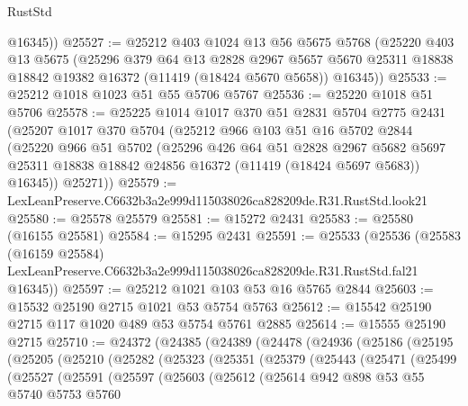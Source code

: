 \begin{lexlean}{RustStd}
\begin{coremodule}
        @16345))
@25527 := @25212
    @403
    @1024
    @13
    @56
    @5675
    @5768
    (@25220
      @403
      @13
      @5675
      (@25296
        @379
        @64
        @13
        @2828
        @2967
        @5657
        @5670
        @25311
        @18838
        @18842
        @19382
        @16372
        (@11419 (@18424 @5670 @5658))
        @16345))
@25533 := @25212 @1018 @1023 @51 @55 @5706 @5767
@25536 := @25220 @1018 @51 @5706
@25578 := @25225
    @1014
    @1017
    @370
    @51
    @2831
    @5704
    @2775
    @2431
    (@25207
      @1017
      @370
      @5704
      (@25212
        @966
        @103
        @51
        @16
        @5702
        @2844
        (@25220
          @966
          @51
          @5702
          (@25296
            @426
            @64
            @51
            @2828
            @2967
            @5682
            @5697
            @25311
            @18838
            @18842
            @24856
            @16372
            (@11419 (@18424 @5697 @5683))
            @16345))
        @25271))
@25579 := LexLeanPreserve.C6632b3a2e999d115038026ca828209de.R31.RustStd.look21
@25580 := @25578 @25579
@25581 := @15272 @2431
@25583 := @25580 (@16155 @25581)
@25584 := @15295 @2431
@25591 := @25533
    (@25536
      (@25583
        (@16159 @25584)
        LexLeanPreserve.C6632b3a2e999d115038026ca828209de.R31.RustStd.fal21
        @16345))
@25597 := @25212 @1021 @103 @53 @16 @5765 @2844
@25603 := @15532 @25190 @2715 @1021 @53 @5754 @5763
@25612 := @15542 @25190 @2715 @117 @1020 @489 @53 @5754 @5761 @2885
@25614 := @15555 @25190 @2715
@25710 := @24372
    (@24385
      (@24389
        (@24478
          (@24936
            (@25186
              (@25195
                (@25205
                  (@25210
                    (@25282
                      (@25323
                        (@25351
                          (@25379
                            (@25443
                              (@25471
                                (@25499
                                  (@25527
                                    (@25591
                                      (@25597
                                        (@25603
                                          (@25612
                                            (@25614
                                              @942
                                              @898
                                              @53
                                              @55
                                              @5740
                                              @5753
                                              @5760

\end{coremodule}
\end{lexlean}
